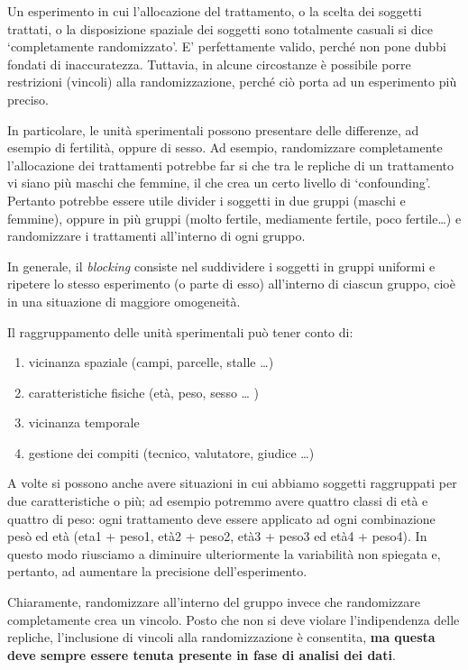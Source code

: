 \documentclass[a4paper,12pt,oneside]{book}
\providecommand{\tightlist}{%
  \setlength{\itemsep}{0pt}\setlength{\parskip}{0pt}}
\theoremstyle{definition}
\theoremstyle{definition}
\theoremstyle{definition}
\theoremstyle{remark}
\begin{document}
Un esperimento in cui l'allocazione del trattamento, o la scelta dei
soggetti trattati, o la disposizione spaziale dei soggetti sono
totalmente casuali si dice `completamente randomizzato'. E'
perfettamente valido, perché non pone dubbi fondati di inaccuratezza.
Tuttavia, in alcune circostanze è possibile porre restrizioni (vincoli)
alla randomizzazione, perché ciò porta ad un esperimento più preciso.

In particolare, le unità sperimentali possono presentare delle
differenze, ad esempio di fertilità, oppure di sesso. Ad esempio,
randomizzare completamente l'allocazione dei trattamenti potrebbe far si
che tra le repliche di un trattamento vi siano più maschi che femmine,
il che crea un certo livello di `confounding'. Pertanto potrebbe essere
utile divider i soggetti in due gruppi (maschi e femmine), oppure in più
gruppi (molto fertile, mediamente fertile, poco fertile\ldots{}) e
randomizzare i trattamenti all'interno di ogni gruppo.

In generale, il \emph{blocking} consiste nel suddividere i soggetti in
gruppi uniformi e ripetere lo stesso esperimento (o parte di esso)
all'interno di ciascun gruppo, cioè in una situazione di maggiore
omogeneità.

Il raggruppamento delle unità sperimentali può tener conto di:

\begin{enumerate}
\def\labelenumi{\arabic{enumi}.}
\tightlist
\item
  vicinanza spaziale (campi, parcelle, stalle \ldots{})
\item
  caratteristiche fisiche (età, peso, sesso \ldots{} )
\item
  vicinanza temporale
\item
  gestione dei compiti (tecnico, valutatore, giudice \ldots{})
\end{enumerate}

A volte si possono anche avere situazioni in cui abbiamo soggetti
raggruppati per due caratteristiche o più; ad esempio potremmo avere
quattro classi di età e quattro di peso: ogni trattamento deve essere
applicato ad ogni combinazione pesò ed età (eta1 + peso1, età2 + peso2,
età3 + peso3 ed età4 + peso4). In questo modo riusciamo a diminuire
ulteriormente la variabilità non spiegata e, pertanto, ad aumentare la
precisione dell'esperimento.

Chiaramente, randomizzare all'interno del gruppo invece che randomizzare
completamente crea un vincolo. Posto che non si deve violare
l'indipendenza delle repliche, l'inclusione di vincoli alla
randomizzazione è consentita, \textbf{ma questa deve sempre essere
tenuta presente in fase di analisi dei dati}.
\end{document}
